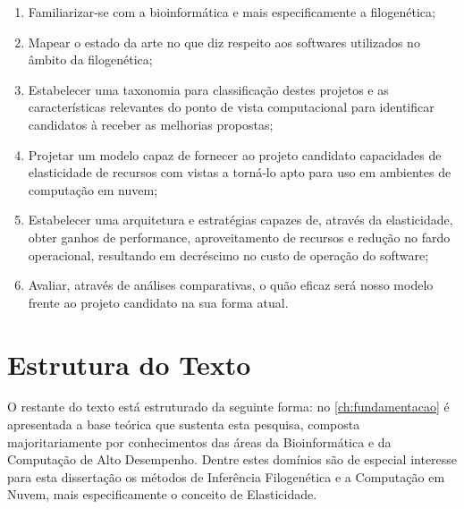 \documentclass[english,brazilian]{UNISINOSmonografia} %
\begin{document}
\begin{enumerate}[label=Objetivo~\arabic*:~,itemindent=*]
	
	\item Familiarizar-se com a bioinformática e mais especificamente a filogenética;
	
	\item Mapear o estado da arte no que diz respeito aos softwares utilizados no âmbito da filogenética;
	
	\item Estabelecer uma taxonomia para classificação destes projetos e as características relevantes do ponto de vista computacional para identificar candidatos à receber as melhorias propostas;
	
	\item Projetar um modelo capaz de fornecer ao projeto candidato capacidades de elasticidade de recursos com vistas a torná-lo apto para uso em ambientes de computação em nuvem;
	
	\item Estabelecer uma arquitetura e estratégias capazes de, através da elasticidade, obter ganhos de performance, aproveitamento de recursos e redução no fardo operacional, resultando em decréscimo no custo de operação do software;
	
	\item Avaliar, através de análises comparativas, o quão eficaz será nosso modelo frente ao projeto candidato na sua forma atual.
	
\end{enumerate}



\section{Estrutura do Texto}


O restante do texto está estruturado da seguinte forma: no \autoref{ch:fundamentacao} é apresentada a base teórica que sustenta esta pesquisa, composta majoritariamente por conhecimentos das áreas da Bioinformática e da Computação de Alto Desempenho. 
Dentre estes domínios são de especial interesse para esta dissertação os métodos de Inferência Filogenética e a Computação em Nuvem, mais especificamente o conceito de Elasticidade.
\end{document}
